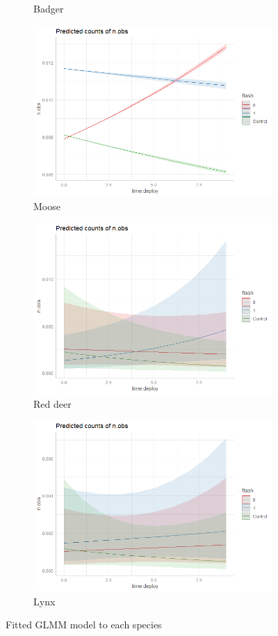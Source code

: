 \begin{figure}
\begin{subfigure}{.5\textwidth}
		  \caption{Badger}
		  	\label{fig:glmm_grvl}
	\end{subfigure}
		\begin{subfigure}{.5\textwidth}
		  \centering
		  	\includegraphics[width=.8\linewidth]{../R/glmm_sp_files/figure-gfm/elg-report-1.png}
		  \caption{Moose}
		  	\label{fig:glmm_elg}
	\end{subfigure}
		\begin{subfigure}{.5\textwidth}
		  \centering
		  	\includegraphics[width=.8\linewidth]{../R/glmm_sp_files/figure-gfm/hjort-report-1.png}
		  \caption{Red deer}
		  	\label{fig:glmm_hjort}
	\end{subfigure}
		\begin{subfigure}{.5\textwidth}
		  \centering
		  	\includegraphics[width=.8\linewidth]{../R/glmm_sp_files/figure-gfm/gaupe-report-1.png}
		  \caption{Lynx}
		  	\label{fig:glmm_gaup}
	\end{subfigure}
		\caption{Fitted GLMM model to each species}
	\label{fig:glmm_sp}
\end{figure}
